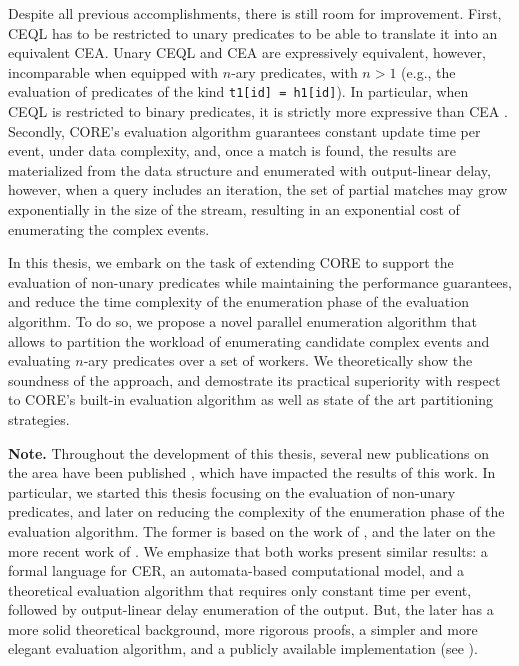 Despite all previous accomplishments, there is still room for improvement. First, CEQL has to be restricted to unary predicates to be able to translate it into an equivalent CEA. Unary CEQL and CEA are expressively equivalent, however, incomparable when equipped with $n$-ary predicates, with $n > 1$ (e.g., the evaluation of predicates of the kind \texttt{t1[id] = h1[id]}). In particular, when CEQL is restricted to binary predicates, it is strictly more expressive than CEA \cite{on-the-expressiveness}. Secondly, CORE's evaluation algorithm guarantees constant update time per event, under data complexity, and, once a match is found, the results are materialized from the data structure and enumerated with output-linear delay, however, when a query includes an iteration, the set of partial matches may grow exponentially in the size of the stream, resulting in an exponential cost of enumerating the complex events.

In this thesis, we embark on the task of extending CORE to support the evaluation of non-unary predicates while maintaining the performance guarantees, and reduce the time complexity of the enumeration phase of the evaluation algorithm. To do so, we propose a novel parallel enumeration algorithm that allows to partition the workload of enumerating candidate complex events and evaluating $n$-ary predicates over a set of workers. We theoretically show the soundness of the approach, and demostrate its practical superiority with respect to CORE's built-in evaluation algorithm as well as state of the art partitioning strategies.

\textbf{Note.} Throughout the development of this thesis, several new publications on the area have been published \cite{formal-framework-cer, core}, which have impacted the results of this work. In particular, we started this thesis focusing on the evaluation of non-unary predicates, and later on reducing the complexity of the enumeration phase of the evaluation algorithm. The former is based on the work of \cite{formal-framework-cep, on-the-expressiveness}, and the later on the more recent work of \cite{formal-framework-cer, core}. We emphasize that both works present similar results: a formal language for CER, an automata-based computational model, and a theoretical evaluation algorithm that requires only constant time per event, followed by output-linear delay enumeration of the output. But, the later has a more solid theoretical background, more rigorous proofs, a simpler and more elegant evaluation algorithm, and a publicly available implementation (see \cite{core-repo}).

